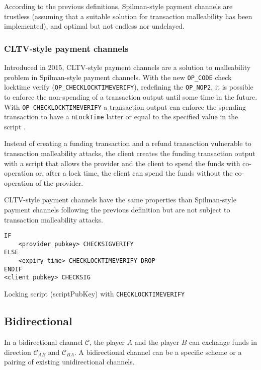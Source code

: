 According to the previous definitions, Spilman-style payment channels are
trustless (assuming that a suitable solution for transaction malleability has
been implemented), and optimal but not endless nor undelayed.

\subsubsection{CLTV-style payment channels}

Introduced in 2015, CLTV-style payment channels are a solution to malleability
problem in Spilman-style payment channels. With the new \texttt{OP\_CODE} check
locktime verify (\texttt{OP\_CHECKLOCKTIMEVERIFY}), redefining the
\texttt{OP\_NOP2}, it is possible to enforce the non-spending of a transaction
output until some time in the future. With \texttt{OP\_CHECKLOCKTIMEVERIFY} a
transaction output can enforce the spending transaction to have a
\texttt{nLockTime} latter or equal to the specified value in the script
\cite{BIP65}.

Instead of creating a funding transaction and a refund transaction vulnerable to
transaction malleability attacks, the client creates the funding transaction
output with a script that allows the provider and the client to spend the funds
with co-operation or, after a lock time, the client can spend the funds without
the co-operation of the provider.

CLTV-style payment channels have the same properties than Spilman-style payment
channels following the previous definition but are not subject to transaction
malleability attacks.

\begin{listing}
  \begin{verbatim}
IF
    <provider pubkey> CHECKSIGVERIFY
ELSE
    <expiry time> CHECKLOCKTIMEVERIFY DROP
ENDIF
<client pubkey> CHECKSIG
  \end{verbatim}
	\caption{Locking script (scriptPubKey) with \texttt{CHECKLOCKTIMEVERIFY}}
	\label{lst:scriptPubKeyCLTV}
\end{listing}

\subsection{Bidirectional}

In a bidirectional channel $\mathcal{C}$, the player $A$ and the player $B$ can
exchange funds in direction $\mathcal{C}_{AB}$ and $\mathcal{C}_{BA}$. A
bidirectional channel can be a specific scheme or a pairing of existing
unidirectional channels.

